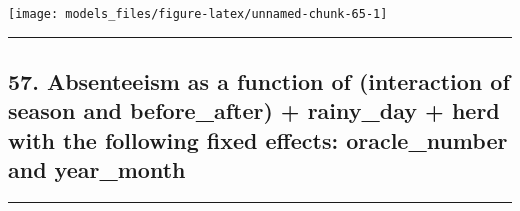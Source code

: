 \documentclass[]{article}
\begin{document}
\begin{center}\texttt{[image: models\_files/figure-latex/unnamed-chunk-65-1]} \end{center}

\newpage

\begin{center}\rule{0.5\linewidth}{\linethickness}\end{center}

\subsection{57. Absenteeism as a function of (interaction of season and
before\_after) + rainy\_day + herd with the following fixed effects:
oracle\_number and
year\_month}\label{absenteeism-as-a-function-of-interaction-of-season-and-before_after-rainy_day-herd-with-the-following-fixed-effects-oracle_number-and-year_month}

\begin{center}\rule{0.5\linewidth}{\linethickness}\end{center}
\end{document}
